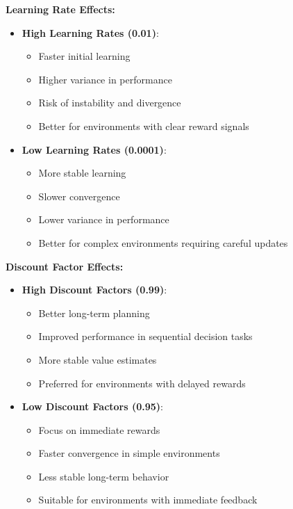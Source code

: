 \documentclass[12pt]{article}
\begin{document}
{{{\textbf{Learning Rate Effects:}
\begin{itemize}
    \item \textbf{High Learning Rates (0.01)}: 
        \begin{itemize}
            \item Faster initial learning
            \item Higher variance in performance
            \item Risk of instability and divergence
            \item Better for environments with clear reward signals
        \end{itemize}
    \item \textbf{Low Learning Rates (0.0001)}:
        \begin{itemize}
            \item More stable learning
            \item Slower convergence
            \item Lower variance in performance
            \item Better for complex environments requiring careful updates
        \end{itemize}
\end{itemize}

\textbf{Discount Factor Effects:}
\begin{itemize}
    \item \textbf{High Discount Factors (0.99)}:
        \begin{itemize}
            \item Better long-term planning
            \item Improved performance in sequential decision tasks
            \item More stable value estimates
            \item Preferred for environments with delayed rewards
        \end{itemize}
    \item \textbf{Low Discount Factors (0.95)}:
        \begin{itemize}
            \item Focus on immediate rewards
            \item Faster convergence in simple environments
            \item Less stable long-term behavior
            \item Suitable for environments with immediate feedback
        \end{itemize}
\end{itemize}

}}}
\end{document}
